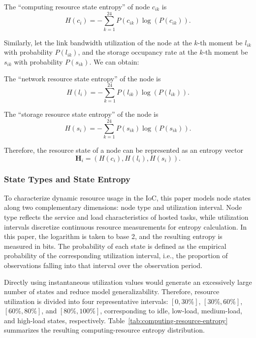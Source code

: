 \documentclass{ccjnl}
\begin{document}
The “computing resource state entropy” of node $c_{ik}$ is
\begin{equation}
	H(c_i) = -\sum_{k=1}^{24} P(c_{ik}) \log\left(P(c_{ik})\right).
\end{equation}

Similarly, let the link bandwidth utilization of the node at the $k$-th moment be $l_{ik}$ with probability $P(l_{ik})$, and the storage occupancy rate at the $k$-th moment be $s_{ik}$ with probability $P(s_{ik})$. We can obtain:

The “network resource state entropy” of the node is
\begin{equation}
H(l_i) = -\sum_{k=1}^{24} P(l_{ik}) \log\left(P(l_{ik})\right).
\end{equation}

The “storage resource state entropy” of the node is
\begin{equation}
H(s_i) = -\sum_{k=1}^{24} P(s_{ik}) \log\left(P(s_{ik})\right).
\end{equation}

Therefore, the resource state of a node can be represented as an entropy vector
\begin{equation}
\mathbf{H}_i = \left(H(c_i), H(l_i), H(s_i)\right).
\end{equation}

\subsubsection{State Types and State Entropy}
\label{s3-4-1}

\begingroup

To characterize dynamic resource usage in the IoC, this paper models node states along two complementary dimensions: node type and utilization interval. Node type reflects the service and load characteristics of hosted tasks, while utilization intervals discretize continuous resource measurements for entropy calculation. In this paper, the logarithm is taken to base 2, and the resulting entropy is measured in bits. The probability of each state is defined as the empirical probability of the corresponding utilization interval, i.e., the proportion of observations falling into that interval over the observation period.

Directly using instantaneous utilization values would generate an excessively large number of states and reduce model generalizability. Therefore, resource
utilization is divided into four representative intervals:
$[0,30\%]$, $[30\%,60\%]$, $[60\%,80\%]$, and $[80\%,100\%]$,
corresponding to idle, low-load, medium-load, and high-load states,
respectively. Table~\ref{tab:computing-resource-entropy} summarizes
the resulting computing-resource entropy distribution.
\end{document}
